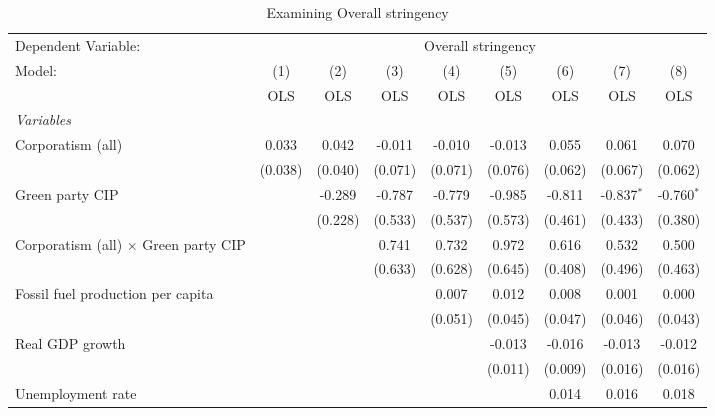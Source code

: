 
\begin{table}[htbp]
   \caption{Examining Overall stringency}
   \centering
   \begin{tabular}{lcccccccc}
      \toprule
      Dependent Variable: & \multicolumn{8}{c}{Overall stringency}\\
      Model:                                      & (1)     & (2)     & (3)     & (4)     & (5)     & (6)     & (7)          & (8)\\  
                                                  &  OLS    & OLS     & OLS     & OLS     & OLS     & OLS     & OLS          & OLS\\  
      \midrule
      \emph{Variables}\\
      Corporatism (all)                           & 0.033   & 0.042   & -0.011  & -0.010  & -0.013  & 0.055   & 0.061        & 0.070\\   
                                                  & (0.038) & (0.040) & (0.071) & (0.071) & (0.076) & (0.062) & (0.067)      & (0.062)\\   
      Green party CIP                             &         & -0.289  & -0.787  & -0.779  & -0.985  & -0.811  & -0.837$^{*}$ & -0.760$^{*}$\\   
                                                  &         & (0.228) & (0.533) & (0.537) & (0.573) & (0.461) & (0.433)      & (0.380)\\   
      Corporatism (all) $\times$ Green party CIP  &         &         & 0.741   & 0.732   & 0.972   & 0.616   & 0.532        & 0.500\\   
                                                  &         &         & (0.633) & (0.628) & (0.645) & (0.408) & (0.496)      & (0.463)\\   
      Fossil fuel production per capita           &         &         &         & 0.007   & 0.012   & 0.008   & 0.001        & 0.000\\   
                                                  &         &         &         & (0.051) & (0.045) & (0.047) & (0.046)      & (0.043)\\   
      Real GDP growth                             &         &         &         &         & -0.013  & -0.016  & -0.013       & -0.012\\   
                                                  &         &         &         &         & (0.011) & (0.009) & (0.016)      & (0.016)\\   
      Unemployment rate                           &         &         &         &         &         & 0.014   & 0.016        & 0.018\\   

\end{tabular}
\end{table}
